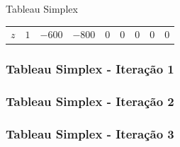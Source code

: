 \begin{frame}
{\begin{block}{Tableau Simplex}
\begin{table}
\begin{tabular}{c c c c c c c c c}
					\cellcolor{blue!80} \color{white} $ \scriptstyle z$
					& \cellcolor{yellow!60}  $ \scriptstyle 1$
					& \cellcolor{yellow!60}  $ \scriptstyle -600$ 
					& \cellcolor{yellow!60}  $ \scriptstyle -800$
					& \cellcolor{yellow!60}  $ \scriptstyle 0$
					& \cellcolor{yellow!60}  $ \scriptstyle 0$
					& \cellcolor{yellow!60}  $ \scriptstyle 0$
					& \cellcolor{yellow!60}  $ \scriptstyle 0$ 
					& \cellcolor{yellow!60}  $ \scriptstyle 0$ \\
 				\end{tabular}
 			\end{table}
 		\end{block}
 	}
\end{frame}

\begin{frame}
	{
	\frametitle{Tableau Simplex - {\color{cyan} Iteração 1}} 
	}
	{
	\frametitle{Tableau Simplex - {\color{cyan} Iteração 2}} 
	}
	{
	\frametitle{Tableau Simplex - {\color{cyan} Iteração 3}} 
	}


\end{frame}
